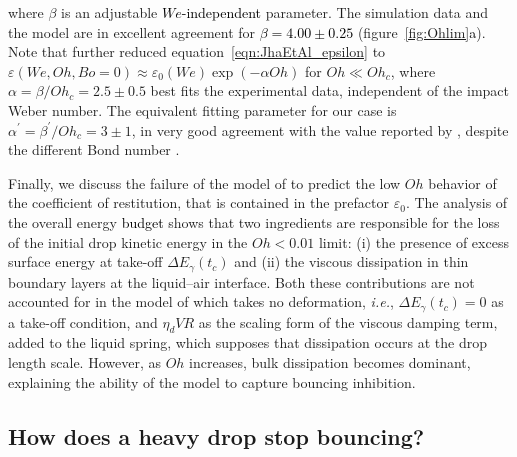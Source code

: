 \documentclass{jfm}
\newcommand{\Ohn}{\mathit{Oh}}
\newcommand{\Ohc}{\mathit{Oh}_\mathit{c}}
\newcommand{\Wen}{\mathit{We}}
\newcommand{\Bon}{\mathit{Bo}}
\newcommand{\revRev}[1]{\textcolor{black}{#1}}
\begin{document}
\noindent where $\beta$ is an adjustable \revRev{$\Wen$-independent} parameter. The simulation data and the model are in excellent agreement for \revRev{$\beta = 4.00 \pm 0.25$} (figure~\ref{fig:Ohlim}\revRev{a}). 
Note that \citet{jha2020viscous} further reduced equation~\eqref{eqn:JhaEtAl_epsilon} to $\varepsilon\left(\Wen, \Ohn, \Bon = 0\right) \approx \varepsilon_0\left(\Wen\right)\exp\left(-\alpha\Ohn\right)$ for $\Ohn \ll \Ohc$, where $\alpha = \beta/\Ohc = 2.5 \pm 0.5$ best fits the experimental data, independent of the impact Weber number. 
The equivalent fitting parameter for our case is $\alpha^{\prime} = \beta^\prime/\Ohc = 3 \pm 1$, in very good agreement with the value reported by \citet{jha2020viscous}, despite the different Bond number \citep[$\Bon = 0$ here {\it vs.} $\Bon = 0.167$ for][also see \S~\ref{sec:LimitingCases:Bo}, and appendix~\ref{app:Weber}]{jha2020viscous}. 

Finally, we discuss the failure of the model of \citet{jha2020viscous} to predict the low $\Ohn$ behavior of the coefficient of restitution, that is contained in the prefactor $\varepsilon_0$.
The analysis of the overall energy \revRev{budget} shows that two ingredients are responsible for the loss of the initial drop kinetic energy in the $\Ohn < 0.01$ limit: (i) the presence of excess surface energy at take-off $\Delta E_\gamma(t_c)$ and (ii) the viscous dissipation in thin boundary layers at the liquid--air interface.
Both these contributions are not accounted for in the model of \citet{jha2020viscous} which takes no deformation, {\it i.e.}, $\Delta E_\gamma(t_c) = 0$ as a take-off condition, and $\eta_d V R$ as the scaling form of the viscous damping term, added to the liquid spring, which supposes that dissipation occurs at the drop length scale. 
However, as $\Ohn$ increases, bulk dissipation becomes dominant, explaining the ability of the model to capture bouncing inhibition.

\subsection{How does a heavy drop stop bouncing?}\label{sec:LimitingCases:Bo}
\end{document}

